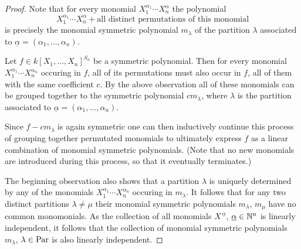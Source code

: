 \begin{proof}
  Note that for every monomial $X_1^{\alpha_1} \dotsm X_n^{\alpha}$ the polynomial
  \[
      X_1^{\alpha_1} \dotsm X_n^{\alpha}
    + \text{all distinct permutations of this monomial}
  \]
  is precisely the monomial symmetric polynomial $m_\lambda$  of the partition $\lambda$ associated to $\underline{\alpha} = (\alpha_1, \dotsc, \alpha_n)$.
  
  Let $f \in k[X_1, \dotsc, X_n]^{S_n}$ be a symmetric polynomial.
  Then for every monomial $X_1^{\alpha_1} \dotsm X_n^{\alpha_n}$ occuring in $f$, all of its permutations must also occur in $f$, all of them with the same coefficient $c$.
  By the above observation all of these monomials can be grouped together to the symmetric polynomial $c m_{\lambda}$, where $\lambda$ is the partition associated to $\underline{\alpha} = (\alpha_1, \dotsc, \alpha_n)$.
  
  Since $f - c m_\lambda$ is again symmetric one can then inductively continue this process of grouping together permutated monomials to ultimately express $f$ as a linear combination of monomial symmetric polynomials.
  (Note that no new monomials are introduced during this process, so that it eventually terminates.)
  
  The beginning observation also shows that a partition $\lambda$ is uniquely determined by any of the monomials $X_1^{\alpha_1} \dotsm X_n^{\alpha_n}$ occuring in $m_\lambda$.
  It follows that for any two distinct partitions $\lambda \neq \mu$ their monomial symmetric polynomials $m_\lambda$, $m_\mu$ have no common monomonials.
  As the collection of all monomials $X^{\,\underline{\alpha}}$, $\underline{\alpha} \in \mathbb{N}^n$ is linearly independent, it follows that the collection of monomial symmetric polynomials $m_\lambda$, $\lambda \in \operatorname{Par}$ is also linearly independent.
\end{proof}



